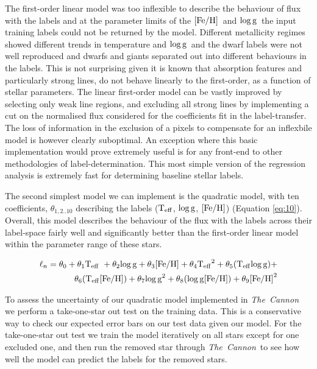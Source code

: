 \documentclass[12pt, preprint]{aastex}
\newcommand{\teff}{\mbox{$\rm T_{eff}$}}
\newcommand{\feh}{\mbox{$\rm [Fe/H]$}}
\newcommand{\logg}{\mbox{$\rm \log g$}}
\newcommand{\tc}{\textsl{The~Cannon}}
\begin{document}
The first-order linear model was too inflexible to describe the behaviour of flux with the labels and at the parameter limits of the \feh\ and \logg\ the input training labels could not be returned by the model. Different metallicity regimes showed different trends in temperature and \logg\ and the dwarf labels were not well reproduced and dwarfs and giants separated out into different behaviours in the labels. This is not surprising given it is known that absorption features and particularly strong lines, do not behave linearly to the first-order, as a function of stellar parameters. 
The linear first-order model can be vastly improved by selecting only weak line regions, and excluding all strong lines by implementing a cut on the normalised flux considered for the coefficients fit in the label-transfer. The loss of information in the exclusion of a pixels to compensate for an inflexbile model is however clearly suboptimal. An exception where this basic implementation would prove extremely useful is for any front-end to other methodologies of label-determination. This most simple version of the regression analysis is extremely fast for determining baseline stellar labels. 

The second simplest model we can implement is the quadratic model, with ten coefficients, $\theta_{1,2..10}$ describing the labels (\teff, \logg, \feh) (Equation \ref{eq:10}).  Overall, this model describes the behaviour of the flux with the labels across their label-space fairly well and significantly better than the first-order linear model within the parameter range of these stars. 

\begin{equation}
\begin{split}
\ell_n = \theta_0 + \theta_1 \teff\ + \theta_2 \logg + \theta_3 \feh + \theta_4 \teff^2 + \theta_5 (\teff \logg) + \\
\theta_6 (\teff \feh) + \theta_7 \logg^2 + \theta_8 (\logg \feh) + \theta_9 \feh^2
\end{split}
 \label{eq:10}
 \end{equation}

To assess the uncertainty of our quadratic model implemented in \tc\, we perform a take-one-star out test on the training data. This is a conservative way to check our expected error bars on our test data given our model. For the take-one-star out test we train the model iteratively on all stars except for one excluded one, and then run the removed star through \tc\, to see how well the model can predict the labels for the removed stars. 
\end{document}

